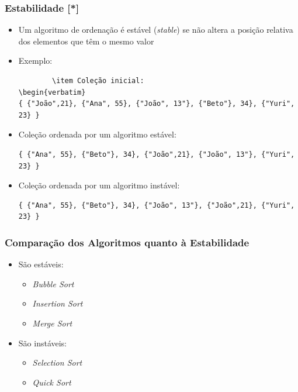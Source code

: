 \documentclass[aspectratio=169]{beamer}
\begin{document}
\begin{frame}[fragile]\frametitle{Estabilidade [*]}
\begin{itemize}	
	\item Um algoritmo de ordenação é estável (\emph{stable}) se não altera a posição relativa dos elementos que têm o mesmo valor
	\item Exemplo:
	\begin{verbatim}
		\item Coleção inicial:
\begin{verbatim}
{ {"João",21}, {"Ana", 55}, {"João", 13"}, {"Beto"}, 34}, {"Yuri", 23} }
\end{verbatim}
		\item Coleção ordenada por um algoritmo estável:
\begin{verbatim}
{ {"Ana", 55}, {"Beto"}, 34}, {"João",21}, {"João", 13"}, {"Yuri", 23} }
\end{verbatim}
		\item Coleção ordenada por um algoritmo instável:
\begin{verbatim}
{ {"Ana", 55}, {"Beto"}, 34}, {"João", 13"}, {"João",21}, {"Yuri", 23} }
\end{verbatim}
\end{itemize}
\end{frame}

\begin{frame}\frametitle{Comparação dos Algoritmos quanto à Estabilidade}
\begin{itemize}	
	\item São estáveis:
	\begin{itemize}	
		\item \emph{Bubble Sort}
		\item \emph{Insertion Sort}
		\item \emph{Merge Sort}
	\end{itemize}
	\item São instáveis:
	\begin{itemize}	
		\item \emph{Selection Sort}
		\item \emph{Quick Sort}
	\end{itemize}
\end{itemize}
\end{frame}
\end{document}
